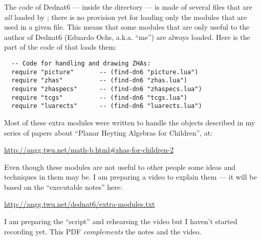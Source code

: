 \documentclass[oneside]{article}
\begin{document}





The code of Dednat6 --- inside the directory  --- is made
of several  files that are {\sl all} loaded by
; there is no provision yet for loading only the
modules that are used in a given  file. This means that some
modules that are only useful to the author of Dednat6 (Eduardo Ochs,
a.k.a. ``me'') are always loaded. Here is the part of the code of
 that loads them:

\begin{verbatim}
  -- Code for handling and drawing ZHAs:
  require "picture"       -- (find-dn6 "picture.lua")
  require "zhas"          -- (find-dn6 "zhas.lua")
  require "zhaspecs"      -- (find-dn6 "zhaspecs.lua")
  require "tcgs"          -- (find-dn6 "tcgs.lua")
  require "luarects"      -- (find-dn6 "luarects.lua")
\end{verbatim}

Most of these extra modules were written to handle the objects
described in my series of papers about ``Planar Heyting Algebras for
Children'', at:

\msk

\url{http://angg.twu.net/math-b.html#zhas-for-children-2}

\msk

Even though these modules are not useful to other people some ideas
and techniques in them may be. I am preparing a video to explain them
--- it will be based on the ``executable notes'' here:

\msk

\url{http://angg.twu.net/dednat6/extra-modules.txt}

\msk

I am preparing the ``script'' and rehearsing the video but I haven't
started recording yet. This PDF {\sl complements} the notes and the
video.




\msk


%                                        
\end{document}

